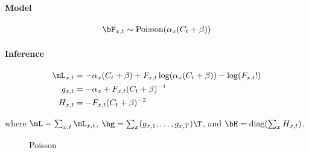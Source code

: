 \paragraph{Model}

\begin{align}
	\bF_{x,t} \sim \text{Poisson}(\alpha_x (C_t + \beta))
\end{align}

\paragraph{Inference}

\begin{subequations} 
\begin{align}
\mL_{x,t} &= -\alpha_x (C_t + \beta) + F_{x,t} \log(\alpha_x(C_t + \beta)) - \log(F_{x,t}!)  \\
g_{x,t} &= -\alpha_x + F_{x,t}(C_t + \beta)^{-1} \\
H_{x,t} &= -F_{x,t} (C_t + \beta)^{-2}
\end{align}
\end{subequations}

\noindent where $\mL=\sum_{x,t} \mL_{x,t}$, $\bg=\sum_x (g_{x,1}, \ldots, g_{x,T})\T$, and $\bH=\text{diag}(\sum_x H_{x,t})$.

\begin{figure}[H]
\caption{Poisson} \label{fig:poiss}
\end{figure}
